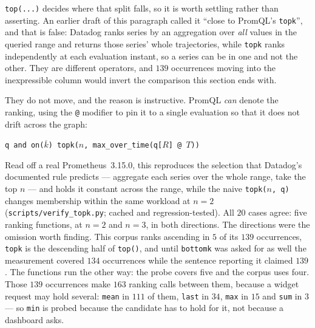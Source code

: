 
\texttt{top(...)} decides where that split falls, so it is worth settling rather than
asserting. An earlier draft of this paragraph called it ``close to PromQL's
\texttt{topk}'', and that is false: Datadog ranks series by an aggregation over
\emph{all} values in the queried range and returns those series' whole trajectories,
while \texttt{topk} ranks independently at each evaluation instant, so a series can be in
one and not the other. They are different operators, and $139$ occurrences moving into
the inexpressible column would invert the comparison this section ends with.

They do not move, and the reason is instructive. PromQL \emph{can} denote the ranking,
using the \texttt{@} modifier to pin it to a single evaluation so that it does not drift
across the graph:
\begin{center}\footnotesize
\texttt{q and on($\overline{k}$) topk($n$, max\_over\_time(q[$R$] @ $T$))}
\end{center}
Read off a real Prometheus~3.15.0, this reproduces the selection that Datadog's
documented rule predicts --- aggregate each series over the whole range, take the top
$n$ --- and holds it constant across the range, while the naive \texttt{topk($n$, q)}
changes membership within the same workload at $n=2$
(\texttt{scripts\slash verify\_topk.py}; cached and regression-tested).
All $20$ cases agree: five ranking
functions, at $n=2$ and $n=3$, in both directions. The directions were the omission worth
finding. This corpus ranks ascending in $5$ of its $139$
occurrences, \texttt{topk} is the descending half of \texttt{top()}, and until
\texttt{bottomk} was asked for as well the measurement covered $134$ occurrences while
the sentence reporting it claimed $139$. The functions run the other way: the probe
covers five and the corpus uses four. Those $139$ occurrences make $163$ ranking
calls between them, because a widget request may hold several: \texttt{mean} in
$111$ of them,
\texttt{last} in $34$, \texttt{max} in $15$ and \texttt{sum} in $3$ --- so \texttt{min}
is probed because the candidate has to hold for it, not because a dashboard asks.

